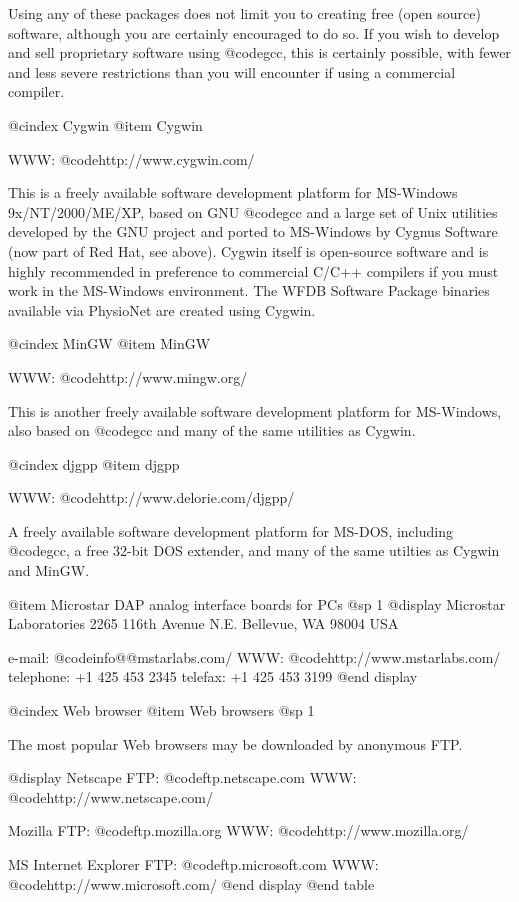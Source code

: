 {{{{{{{{{Using any of these packages does not limit you to creating free (open
source) software, although you are certainly encouraged to do so.  If you
wish to develop and sell proprietary software using @code{gcc}, this is
certainly possible, with fewer and less severe restrictions than you
will encounter if using a commercial compiler.

@cindex Cygwin
@item Cygwin

WWW: @code{http://www.cygwin.com/}

This is a freely available software development platform for MS-Windows
9x/NT/2000/ME/XP, based on GNU @code{gcc} and a large set of Unix
utilities developed by the GNU project and ported to MS-Windows by
Cygnus Software (now part of Red Hat, see above).  Cygwin itself is
open-source software and is highly recommended in preference to
commercial C/C++ compilers if you must work in the MS-Windows
environment.  The WFDB Software Package binaries available via PhysioNet
are created using Cygwin.

@cindex MinGW
@item MinGW

WWW: @code{http://www.mingw.org/}

This is another freely available software development platform for
MS-Windows, also based on @code{gcc} and many of the same utilities as
Cygwin.

@cindex djgpp
@item djgpp

WWW: @code{http://www.delorie.com/djgpp/}

A freely available software development platform for MS-DOS, including
@code{gcc}, a free 32-bit DOS extender, and many of the same utilties
as Cygwin and MinGW.

@item Microstar DAP analog interface boards for PCs
@sp 1
@display
Microstar Laboratories
2265 116th Avenue N.E.
Bellevue, WA 98004 USA

e-mail: @code{info@@mstarlabs.com/}
WWW: @code{http://www.mstarlabs.com/}
telephone: +1 425 453 2345
telefax: +1 425 453 3199
@end display

@cindex Web browser
@item Web browsers
@sp 1

The most popular Web browsers may be downloaded by anonymous FTP.

@display
Netscape
FTP: @code{ftp.netscape.com}
WWW: @code{http://www.netscape.com/}

Mozilla
FTP: @code{ftp.mozilla.org}
WWW: @code{http://www.mozilla.org/}

MS Internet Explorer
FTP: @code{ftp.microsoft.com}
WWW: @code{http://www.microsoft.com/}
@end display
@end table

}}}}}}}}}
